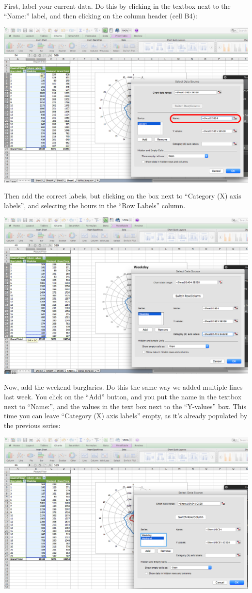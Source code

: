 \documentclass[
]{book}
\begin{document}
First, label your current data. Do this by clicking in the textbox next to the ``Name:'' label, and then clicking on the column header (cell B4):

\includegraphics{imgs/hr_r_22.png}

Then add the correct labels, but clicking on the box next to ``Category (X) axis labels'', and selecting the hours in the ``Row Labels'' column.

\includegraphics{imgs/hr_r_23.png}

Now, add the weekend burglaries. Do this the same way we added multiple lines last week. You click on the ``Add'' button, and you put the name in the textbox next to ``Name:'', and the values in the text box next to the ``Y-values'' box. This time you can leave ``Category (X) axis labels'' empty, as it's already populated by the previous series:

\includegraphics{imgs/hr_r_24.png}
\end{document}
